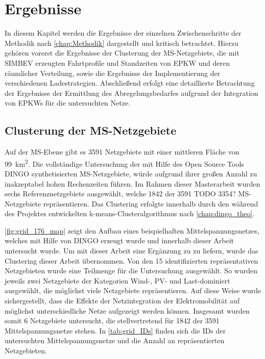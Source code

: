 
\section{Ergebnisse}

In diesem Kapitel werden die Ergebnisse der einzelnen Zwischenschritte der Methodik nach \autoref{chap:Methodik} dargestellt und kritisch betrachtet.
Hierzu gehören vorerst die Ergebnisse der Clusterung der \gls{MS}-Netzgebiete, die mit \gls{SIMBEV} erzeugten Fahrtprofile und Standzeiten von \gls{EPKW} und deren räumlicher Verteilung, sowie die Ergebnisse der Implementierung der verschiedenen Ladestrategien.
Abschließend erfolgt eine detaillierte Betrachtung der Ergebnisse der Ermittlung des Abregelungsbedarfes aufgrund der Integration von \glspl{EPKW} für die untersuchten Netze.


\subsection{Clusterung der MS-Netzgebiete}

Auf der \gls{MS}-Ebene gibt es \num{3591} Netzgebiete mit einer mittleren Fläche von \SI{99}{\km\squared}.
Die vollständige Untersuchung der mit Hilfe des Open Source Tools \gls{DINGO} synthetisierten \gls{MS}-Netzgebiete, würde aufgrund ihrer großen Anzahl zu inakzeptabel hohen Rechenzeiten führen.
Im Rahmen dieser Masterarbeit wurden sechs Referenznetzgebiete ausgewählt, welche \num{1842} der \num{3591} {\color{red} TODO 3354?} \gls{MS}-Netzgebiete repräsentieren.
Das Clustering erfolgte innerhalb \cite{Schachler} durch den während des \openego Projektes entwickelten k-means-Clusteralgorithmus nach \autoref{chap:dingo_theo}.



\autoref{fig:grid_176_map} zeigt den Aufbau eines beispielhaften Mittelspannungsnetzes, welches mit Hilfe von \gls{DINGO} erzeugt wurde und innerhalb dieser Arbeit untersucht wurde.
Um mit dieser Arbeit eine Ergänzung zu \cite{Schachler} zu liefern, wurde das Clustering dieser Arbeit übernommen.
Von den \num{15} identifizierten repräsentativen Netzgebieten wurde eine Teilmenge für die Untersuchung ausgewählt.
So wurden jeweils zwei Netzgebiete der Kategorien Wind-, \gls{PV}- und Last-dominiert ausgewählt, die möglichst viele Netzgebiete repräsentieren.
Auf diese Weise wurde sichergestellt, dass die Effekte der Netzintegration der Elektromobilität auf möglichst unterschiedliche Netze aufgezeigt werden können.
Insgesamt wurden somit \num{6} Netzgebiete untersucht, die stellvertretend für \num{1842} der \num{3591} Mittelspannungsnetze stehen.
In \autoref{tab:grid_IDs} finden sich die \glspl{ID} der untersuchten Mittelspannungsnetze und die Anzahl an repräsentierten Netzgebieten.

